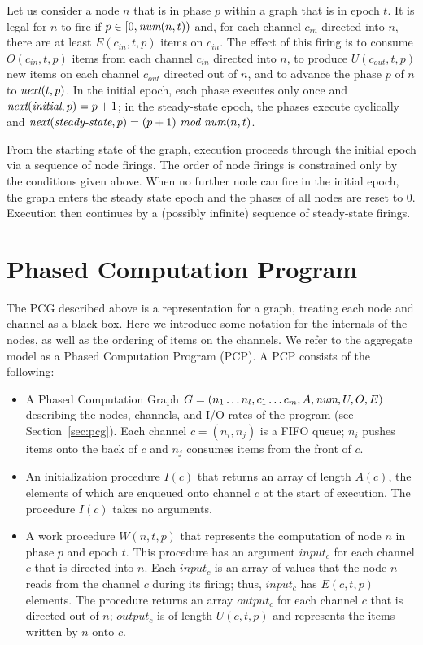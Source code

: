 Let us consider a node $n$ that is in phase $p$ within a graph that is
in epoch $t$.  It is legal for $n$ to fire if $p \in [0, \mbox{\it num}(n,
t))$ and, for each channel $c_{in}$ directed into $n$, there are at
least $E(c_{in}, t, p)$ items on $c_{in}$.  The effect of this firing
is to consume $O(c_{in}, t, p)$ items from each channel $c_{in}$
directed into $n$, to produce $U(c_{out}, t, p)$ new items on each
channel $c_{out}$ directed out of $n$, and to advance the phase $p$ of
$n$ to $\mbox{\it next}(t, p)$.  In the initial epoch, each phase executes
only once and $\mbox{\it next}(\mbox{\it initial}, p) = p + 1$; in the
steady-state epoch, the phases execute cyclically and
$\mbox{\it next}(\mbox{\it steady-state}, p) = (p + 1)~\mbox{\it mod}~\mbox{\it num}(n, t)$.

From the starting state of the graph, execution proceeds through the
initial epoch via a sequence of node firings.  The order of node
firings is constrained only by the conditions given above.  When no
further node can fire in the initial epoch, the graph enters the
steady state epoch and the phases of all nodes are reset to 0.
Execution then continues by a (possibly infinite) sequence of
steady-state firings.

\section{Phased Computation Program}

The PCG described above is a representation for a graph, treating each
node and channel as a black box.  Here we introduce some notation for
the internals of the nodes, as well as the ordering of items on the
channels.  We refer to the aggregate model as a Phased Computation
Program (PCP).  A PCP consists of the following:
\begin{itemize}

\item A Phased Computation Graph $G = (n_1 \dots n_l, c_1 \dots c_m,
A, \mbox{\it num}, U, O, E)$ describing the nodes, channels, and I/O rates
of the program (see Section~\ref{sec:pcg}).  Each channel $c = (n_i,
n_j)$ is a FIFO queue; $n_i$ pushes items onto the back of $c$ and
$n_j$ consumes items from the front of $c$.

\item An initialization procedure $I(c)$ that returns an array of
length $A(c)$, the elements of which are enqueued onto channel $c$ at
the start of execution.  The procedure $I(c)$ takes no arguments.

\item A work procedure $W(n, t, p)$ that represents the computation of
node $n$ in phase $p$ and epoch $t$.  This procedure has an argument
$input_c$ for each channel $c$ that is directed into $n$.  Each
$input_c$ is an array of values that the node $n$ reads from the
channel $c$ during its firing; thus, $input_c$ has $E(c, t, p)$
elements.  The procedure returns an array $output_c$ for each channel
$c$ that is directed out of $n$; $output_c$ is of length $U(c, t, p)$
and represents the items written by $n$ onto $c$.

\end{itemize}

